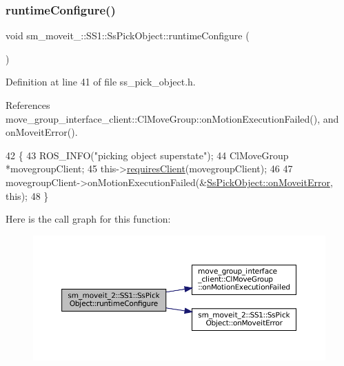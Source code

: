 \subsubsection{\texorpdfstring{runtime\+Configure()}{runtimeConfigure()}}
{\footnotesize\ttfamily void sm\+\_\+moveit\+\_\+::\+S\+S1\+::\+Ss\+Pick\+Object\+::runtime\+Configure (\begin{DoxyParamCaption}{ }\end{DoxyParamCaption})\hspace{0.3cm}{\ttfamily [inline]}}



Definition at line 41 of file ss\+\_\+pick\+\_\+object.\+h.



References move\+\_\+group\+\_\+interface\+\_\+client\+::\+Cl\+Move\+Group\+::on\+Motion\+Execution\+Failed(), and on\+Moveit\+Error().


\begin{DoxyCode}
42     \{
43         ROS\_INFO(\textcolor{stringliteral}{"picking object superstate"});
44         ClMoveGroup *movegroupClient;
45         this->\hyperlink{classsmacc_1_1ISmaccState_a7f95c9f0a6ea2d6f18d1aec0519de4ac}{requiresClient}(movegroupClient);
46 
47         movegroupClient->onMotionExecutionFailed(&\hyperlink{structsm__moveit__2_1_1SS1_1_1SsPickObject_af87168e32fc8acb369f87f2ce438bd29}{SsPickObject::onMoveitError}, \textcolor{keyword}{
      this});
48     \}
\end{DoxyCode}
Here is the call graph for this function\+:
\nopagebreak
\begin{figure}[H]
\begin{center}
\leavevmode
\includegraphics[width=350pt]{structsm__moveit__2_1_1SS1_1_1SsPickObject_a7545dc96063c5a0930d671c973b13f6e_cgraph}
\end{center}
\end{figure}
\mbox{\label{structsm__moveit__2_1_1SS1_1_1SsPickObject_a60e52cff4499c46a88230b0b6411f15b}} 
